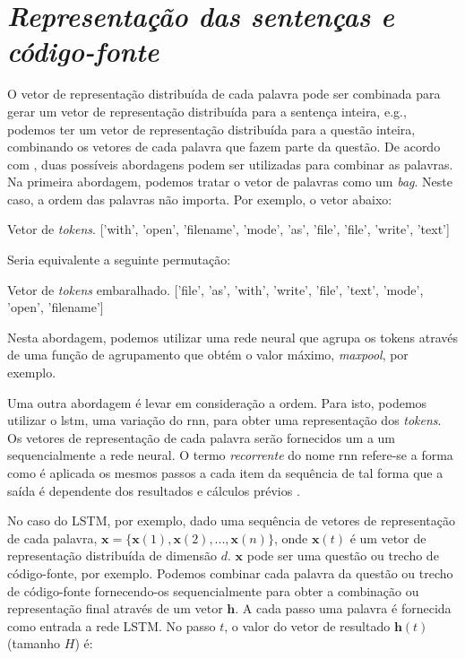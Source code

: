 \section{\textit{Representação das sentenças e código-fonte}}
\label{sec:representacao-das-sentencas-fundamentacao-teorica}

O vetor de representação distribuída de cada palavra pode ser combinada para gerar um vetor de representação distribuída para a sentença inteira, e.g., podemos ter um vetor de representação distribuída para a questão inteira, combinando os vetores de cada palavra que fazem parte da questão. De acordo com \cite{cambronero-deep-learning-code-search:2019}, duas possíveis abordagens podem ser utilizadas para combinar as palavras. Na primeira abordagem, podemos tratar o vetor de palavras como um \textit{bag}. Neste caso, a ordem das palavras não importa. Por exemplo, o vetor abaixo:

\begin{mypythonembedding}{Vetor de \textit{tokens}.}
  ['with', 'open', 'filename', 'mode', 'as', 'file', 'file', 'write', 'text']
\end{mypythonembedding}

Seria equivalente a seguinte permutação:

\begin{mypythonembedding}{Vetor de \textit{tokens} embaralhado.}
['file', 'as', 'with', 'write', 'file', 'text', 'mode', 'open', 'filename']
\end{mypythonembedding}

Nesta abordagem, podemos utilizar uma rede neural que agrupa os tokens através de uma função de agrupamento que obtém o valor máximo, \textit{maxpool}, por exemplo.

Uma outra abordagem é levar em consideração a ordem. Para isto, podemos utilizar o \acrfull{lstm}, uma variação do \acrfull{rnn}, para obter uma representação dos \textit{tokens}. Os vetores de representação de cada palavra serão fornecidos um a um sequencialmente a rede neural. O termo \emph{recorrente} do nome \acrfull{rnn} refere-se a forma como é aplicada os mesmos passos a cada item da sequência de tal forma que a saída é dependente dos resultados e cálculos prévios \citep{tom-young:trends-deep-learning-nlp}.



No caso do LSTM, por exemplo, dado uma sequência de vetores de representação de cada palavra, $\bm{x} = \{ \bm{x}(1), \bm{x}(2), . . ., \bm{x}(n) \}$, onde $\bm{x}(t)$ é um vetor de representação distribuída de dimensão $d$. $\bm{x}$ pode ser uma questão ou trecho de código-fonte, por exemplo. Podemos combinar cada palavra da questão ou trecho de código-fonte fornecendo-os sequencialmente para obter a combinação ou representação final através de um vetor $\bm{h}$. A cada passo uma palavra é fornecida como entrada a rede LSTM. No passo $t$, o valor do vetor de resultado $\bm{h}(t)$ (tamanho $H$) é:

